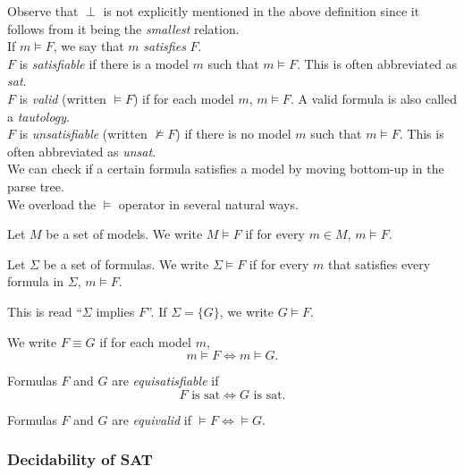 Observe that $\perp$ is not explicitly mentioned in the above definition since it follows from it being the \textit{smallest} relation.\\

If $m\vDash F$, we say that $m$ \textit{satisfies} $F$.\\
$F$ is \textit{satisfiable} if there is a model $m$ such that $m\vDash F$. This is often abbreviated as \textit{sat}.\\
$F$ is \textit{valid} (written $\vDash F$) if for each model $m$, $m\vDash F$. A valid formula is also called a \textit{tautology}.\\
$F$ is \textit{unsatisfiable} (written $\nvDash F$) if there is no model $m$ such that $m\vDash F$. This is often abbreviated as \textit{unsat}.\\

We can check if a certain formula satisfies a model by moving bottom-up in the parse tree.\\

We overload the $\vDash$ operator in several natural ways.

\begin{definition}
Let $M$ be a set of models. We write $M\vDash F$ if for every $m\in M$, $m\vDash F$.
\end{definition}

\begin{definition}
Let $\Sigma$ be a set of formulas. We write $\Sigma\vDash F$ if for every $m$ that satisfies every formula in $\Sigma$, $m\vDash F$.
\end{definition}

This is read ``$\Sigma$ implies $F$''. If $\Sigma=\{G\}$, we write $G\vDash F$.

\begin{definition}
We write $F\equiv G$ if for each model $m$,
\[ m\vDash F \iff m\vDash G. \]
\end{definition}

\begin{definition}
Formulas $F$ and $G$ are \textit{equisatisfiable} if
\[ F \text{ is sat} \iff G \text{ is sat.}\]
\end{definition}

\begin{definition}
Formulas $F$ and $G$ are \textit{equivalid} if $\vDash F\iff\vDash G$.
\end{definition}

\subsubsection{Decidability of SAT}

